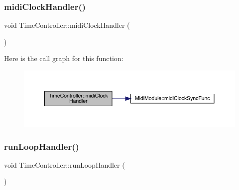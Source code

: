 \subsubsection{\texorpdfstring{midi\+Clock\+Handler()}{midiClockHandler()}}
{\footnotesize\ttfamily void Time\+Controller\+::midi\+Clock\+Handler (\begin{DoxyParamCaption}{ }\end{DoxyParamCaption})}

Here is the call graph for this function\+:
\nopagebreak
\begin{figure}[H]
\begin{center}
\leavevmode
\includegraphics[width=350pt]{class_time_controller_a56442319aea3eaed083882a0f148fe26_cgraph}
\end{center}
\end{figure}
\mbox{\label{class_time_controller_ae1e9001e3739f3e077f4679b98650e91}} 
\subsubsection{\texorpdfstring{run\+Loop\+Handler()}{runLoopHandler()}}
{\footnotesize\ttfamily void Time\+Controller\+::run\+Loop\+Handler (\begin{DoxyParamCaption}{ }\end{DoxyParamCaption})}

